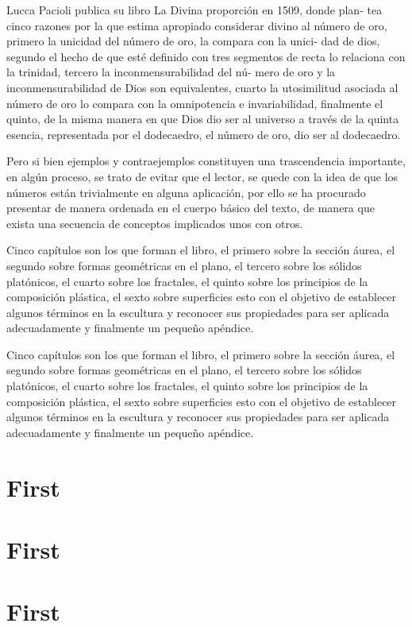 \documentclass[12pt,a4paper]{book}
\begin{document}
Lucca Pacioli publica su libro La Divina proporción en 1509, donde plan-
tea cinco razones por la que estima apropiado considerar divino al número
de oro, primero la unicidad del número de oro, la compara con la unici-
dad de dios, segundo el hecho de que esté definido con tres segmentos de
recta lo relaciona con la trinidad, tercero la inconmensurabilidad del nú-
mero de oro y la inconmensurabilidad de Dios son equivalentes, cuarto la
utosimilitud asociada al número de oro lo compara con la omnipotencia e
invariabilidad, finalmente el quinto, de la misma manera en que Dios dio ser
al universo a través de la quinta esencia, representada por el dodecaedro,
el número de oro, dio ser al dodecaedro.

Pero si bien ejemplos y contraejemplos constituyen una trascendencia
importante, en algún proceso, se trato de evitar que el lector, se quede con
la idea de que los números están trivialmente en alguna aplicación, por
ello se ha procurado presentar de manera ordenada en el cuerpo básico del
texto, de manera que exista una secuencia de conceptos implicados unos
con otros.

Cinco capítulos son los que forman el libro, el primero sobre la sección
áurea, el segundo sobre formas geométricas en el plano, el tercero sobre los
sólidos platónicos, el cuarto sobre los fractales, el quinto sobre los principios
de la composición plástica, el sexto sobre superficies esto con el objetivo de
establecer algunos términos en la escultura y reconocer sus propiedades
para ser aplicada adecuadamente y finalmente un pequeño apéndice.

Cinco capítulos son los que forman el libro, el primero sobre la sección
áurea, el segundo sobre formas geométricas en el plano, el tercero sobre los
sólidos platónicos, el cuarto sobre los fractales, el quinto sobre los principios
de la composición plástica, el sexto sobre superficies esto con el objetivo de
establecer algunos términos en la escultura y reconocer sus propiedades
para ser aplicada adecuadamente y finalmente un pequeño apéndice.
\chapter{First}
\chapter{First}
\chapter{First}
\end{document}
